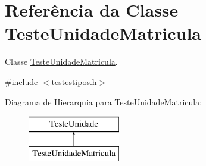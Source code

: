 \hypertarget{class_teste_unidade_matricula}{
\section{\-Referência da \-Classe \-Teste\-Unidade\-Matricula}
\label{class_teste_unidade_matricula}
}


\-Classe \hyperlink{class_teste_unidade_matricula}{\-Teste\-Unidade\-Matricula}.  




{\ttfamily \#include $<$testestipos.\-h$>$}

\-Diagrama de \-Hierarquia para \-Teste\-Unidade\-Matricula\-:\begin{figure}[H]
\begin{center}
\leavevmode
\includegraphics[height=2.000000cm]{class_teste_unidade_matricula}
\end{center}
\end{figure}
